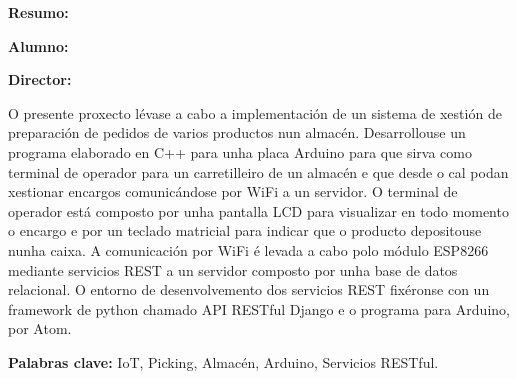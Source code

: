 
\thispagestyle{empty}

\bigskip
\bigskip

\large{
\textbf{Resumo:}}

\bigskip
\bigskip


\begin{center}
\textbf{\titulouno}
\end{center}

\bigskip
\bigskip
\large{
\textbf{Alumno:}}\alumno

\large{
\textbf{Director:}} \tutoruno


%


%
%
\bigskip
\bigskip


O presente proxecto lévase a cabo a implementación de un sistema de xestión de preparación de pedidos de varios productos nun almacén.
Desarrollouse un programa elaborado en C++ para unha placa Arduino para que sirva como terminal de operador para un carretilleiro de un almacén e que desde o cal podan xestionar encargos comunicándose por WiFi a un servidor.
O terminal de operador está composto por unha pantalla LCD para visualizar en todo momento o encargo e por un teclado matricial para indicar que o producto depositouse nunha caixa.
A comunicación por WiFi é levada a cabo polo módulo ESP8266 mediante servicios REST a un servidor composto por unha base de datos relacional.
O entorno de desenvolvemento dos servicios REST fixéronse con un framework de python chamado API RESTful Django e o programa para Arduino, por Atom.
 

\bigskip
\bigskip

\textbf{Palabras clave:} IoT, Picking, Almacén, Arduino, Servicios RESTful.


\newpage{\pagestyle{empty}\cleardoublepage}